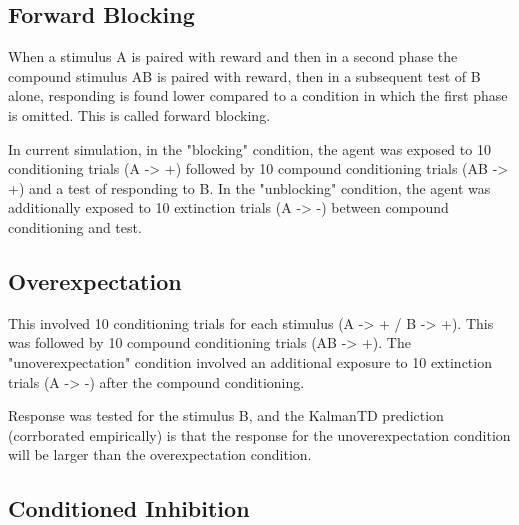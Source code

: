 \documentclass[11pt]{article}
\begin{document}
\begin{center}

\end{center}

\newpage

\subsection{Forward Blocking}
\label{sec:orged79ebc}

When a stimulus A is paired with reward and then in a second phase the compound stimulus AB is paired with reward, then in a subsequent test of B alone, responding is found lower compared to a condition in which the first phase is omitted. This is called forward blocking.   

In current simulation, in the "blocking" condition, the agent was exposed to 10 conditioning trials (A -> +) followed by 10 compound conditioning trials (AB -> +) and a test of responding to B. In the "unblocking" condition, the agent was additionally exposed to 10 extinction trials (A -> -) between compound conditioning and test.

\begin{center}

\end{center}

\newpage

\subsection{Overexpectation}
\label{sec:org4b80006}

This involved 10 conditioning trials for each stimulus (A -> + / B -> +). This was followed by 10 compound conditioning trials (AB -> +). The "unoverexpectation" condition involved an additional exposure to 10 extinction trials (A -> -) after the compound conditioning.

Response was tested for the stimulus B, and the KalmanTD prediction (corrborated empirically) is that the response for the unoverexpectation condition will be larger than the overexpectation condition. 

\begin{center}

\end{center}

\newpage

\subsection{Conditioned Inhibition}
\label{sec:orgdb1e32b}
\end{document}

